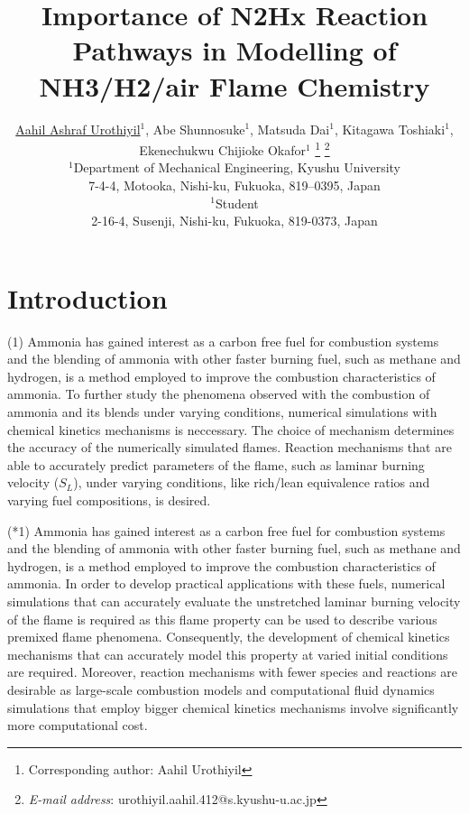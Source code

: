 \documentclass[10pt,twocolumn]{icfd2026paper}
\title{Importance of N2Hx Reaction Pathways in Modelling of NH3/H2/air Flame Chemistry}
\author{\underline{Aahil Ashraf Urothiyil}${}^1$,
	Abe Shunnosuke${}^1$, Matsuda Dai${}^1$, Kitagawa Toshiaki${}^1$, Ekenechukwu Chijioke Okafor${}^1$
	\footnote{\normalsize Corresponding author: Aahil Urothiyil}
	\footnote{\normalsize {\textit{E-mail address}}:  urothiyil.aahil.412@s.kyushu-u.ac.jp}
	\\
	${}^1$Department of Mechanical Engineering, Kyushu University \\
	7-4-4, Motooka, Nishi-ku, Fukuoka, 819--0395, Japan \\
	${}^1$Student \\ %
	2-16-4, Susenji, Nishi-ku, Fukuoka, 819-0373, Japan
}
\begin{document}
\maketitle
\thispagestyle{empty}

\section{Introduction}

(1) Ammonia has gained interest as a carbon free fuel for combustion systems and the blending of ammonia with other faster burning fuel, such as methane and hydrogen, is a method employed to improve the combustion characteristics of ammonia. To further study the phenomena observed with the combustion of ammonia and its blends under varying conditions, numerical simulations with chemical kinetics mechanisms is neccessary. The choice of mechanism determines the accuracy of the numerically simulated flames. Reaction mechanisms that are able to accurately predict parameters of the flame, such as laminar burning velocity ($S_L$), under varying conditions, like rich/lean equivalence ratios and varying fuel compositions, is desired.

(*1) Ammonia has gained interest as a carbon free fuel for combustion systems and the blending of ammonia with other faster burning fuel, such as methane and hydrogen, is a method employed to improve the combustion characteristics of ammonia. In order to develop practical applications with these fuels, numerical simulations that can accurately evaluate the unstretched laminar burning velocity of the flame is required as this flame property can be used to describe various premixed flame phenomena. Consequently, the development of chemical kinetics mechanisms that can accurately model this property at varied initial conditions are required. Moreover, reaction mechanisms with fewer species and reactions are desirable as large-scale combustion models and computational fluid dynamics simulations that employ bigger chemical kinetics mechanisms involve significantly more computational cost.
\end{document}
